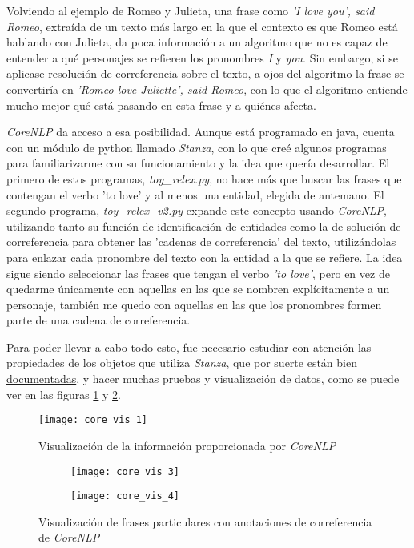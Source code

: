 \documentclass{pre-tfg}
\begin{document}
Volviendo al ejemplo de Romeo y Julieta, una frase como \textit{'I love you', said Romeo}, extraída de un texto más largo en la que el contexto es que Romeo está hablando con Julieta, da poca información a un algoritmo que no es capaz de entender a qué personajes se refieren los pronombres \textit{I} y \textit{you}. Sin embargo, si se aplicase resolución de correferencia sobre el texto, a ojos del algoritmo la frase se convertiría en \textit{'Romeo love Juliette', said Romeo}, con lo que el algoritmo entiende mucho mejor qué está pasando en esta frase y a quiénes afecta.\label{nota:corref}

\textit{CoreNLP} da acceso a esa posibilidad. Aunque está programado en java, cuenta con un módulo de python llamado \textit{Stanza}, con lo que creé algunos programas para familiarizarme con su funcionamiento y la idea que quería desarrollar. El primero de estos programas, \textit{toy\_relex.py}, no hace más que buscar las frases que contengan el verbo 'to love' y al menos una entidad, elegida de antemano. El segundo programa, \textit{toy\_relex\_v2.py} expande este concepto usando \textit{CoreNLP}, utilizando tanto su función de identificación de entidades como la de solución de correferencia para obtener las 'cadenas de correferencia' del texto, utilizándolas para enlazar cada pronombre del texto con la entidad a la que se refiere. La idea sigue siendo seleccionar las frases que tengan el verbo \textit{'to love'}, pero en vez de quedarme únicamente con aquellas en las que se nombren explícitamente a un personaje, también me quedo con aquellas en las que los pronombres formen parte de una cadena de correferencia.

Para poder llevar a cabo todo esto, fue necesario estudiar con atención las propiedades de los objetos que utiliza \textit{Stanza}, que por suerte están bien \href{https://github.com/stanfordnlp/stanza/blob/master/doc/CoreNLP.proto}{documentadas}, y hacer muchas pruebas y visualización de datos, como se puede ver en las figuras \ref{fig:core_visualization_0} y \ref{fig:core_visualization_1}.


\begin{figure}
	\centering
	\texttt{[image: core\_vis\_1]}
	\caption{Visualización de la información proporcionada por \textit{CoreNLP}}
	\label{fig:core_visualization_0}
\end{figure}

\begin{figure}
	\centering
	\begin{subfigure}{.45\textwidth}
		\centering
		\texttt{[image: core\_vis\_3]}
	\end{subfigure}%
	\begin{subfigure}{.45\textwidth}
		\centering
		\texttt{[image: core\_vis\_4]}
	\end{subfigure}

	\caption{Visualización de frases particulares con anotaciones de correferencia de \textit{CoreNLP}}
	\label{fig:core_visualization_1}
\end{figure}
\end{document}
